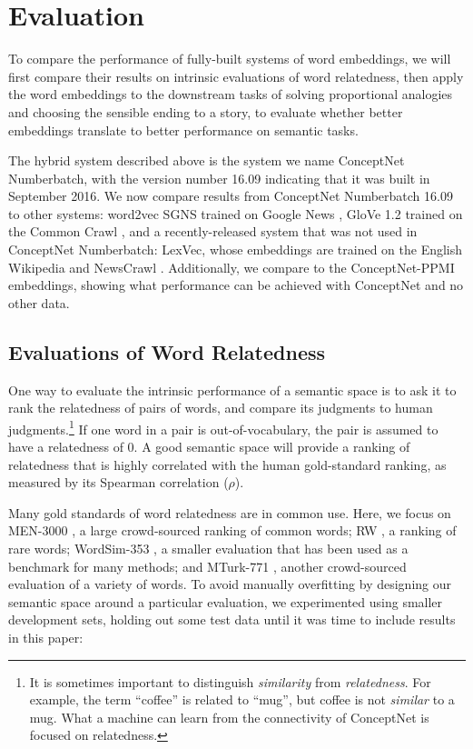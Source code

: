 \documentclass[letterpaper]{article}
\begin{document}
\section{Evaluation}

To compare the performance of fully-built systems of word embeddings, we will
first compare their results on intrinsic evaluations of word relatedness, then
apply the word embeddings to the downstream tasks of solving proportional
analogies and choosing the sensible ending to a story, to evaluate whether
better embeddings translate to better performance on semantic tasks.

The hybrid system described above is the system we name ConceptNet Numberbatch,
with the version number 16.09 indicating that it was built in September 2016.
We now compare results from ConceptNet Numberbatch 16.09 to other systems:
word2vec SGNS trained on Google News \cite{mikolov2013word2vec}, GloVe 1.2
trained on the Common Crawl \cite{pennington2014glove}, and a recently-released
system that was not used in ConceptNet Numberbatch: LexVec, whose embeddings
are trained on the English Wikipedia and NewsCrawl \cite{salle2016lexvec}.
Additionally, we compare to the ConceptNet-PPMI embeddings, showing what performance
can be achieved with ConceptNet and no other data.

\subsection{Evaluations of Word Relatedness}
\label{intrinsic-evaluations}

One way to evaluate the intrinsic performance of a semantic space is to ask it
to rank the relatedness of pairs of words, and compare its judgments to human
judgments.\footnote{It is sometimes important to distinguish \emph{similarity}
from \emph{relatedness}. For example, the term ``coffee'' is related to
``mug'', but coffee is not \emph{similar} to a mug. What a machine can learn
from the connectivity of ConceptNet is focused on relatedness.} If one word in
a pair is out-of-vocabulary, the pair is assumed to have a relatedness of 0. A
good semantic space will provide a ranking of relatedness that is highly
correlated with the human gold-standard ranking, as measured by its Spearman
correlation ($\rho$).

Many gold standards of word relatedness are in common use. Here, we focus on
MEN-3000 \cite{bruni2014men}, a large crowd-sourced ranking of common words; RW
\cite{luong2013rw}, a ranking of rare words; WordSim-353 \cite{finkelstein2001ws},
a smaller evaluation that has been used as a benchmark for many methods; and MTurk-771
\cite{halawi2012mturk}, another crowd-sourced evaluation of a variety of words.
To avoid manually overfitting by designing our semantic space around a
particular evaluation, we experimented using smaller development sets, holding
out some test data until it was time to include results in this paper:
\end{document}
